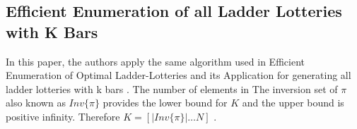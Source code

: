 \subsection{Efficient Enumeration of all Ladder Lotteries with K Bars}

In this paper, the authors apply the same algorithm used in Efficient Enumeration of Optimal Ladder-Lotteries 
and its Application for generating all ladder lotteries with k bars \cite{A4}. The number of elements 
in The inversion set of $\pi$ also known as $Inv\{\pi\}$ provides the lower bound for $K$ 
and the upper bound is positive infinity. Therefore $K=[|Inv\{\pi\}| \dots N]$ \cite{A4}.\par